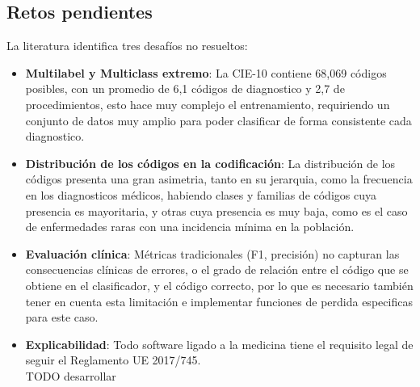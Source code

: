 \subsection{Retos pendientes}
La literatura identifica tres desafíos no resueltos:
\begin{itemize}
\item \textbf{Multilabel y Multiclass extremo}: La CIE-10 contiene 68,069 códigos posibles, con un promedio de 6,1 códigos de diagnostico y 2,7 de procedimientos, esto hace muy complejo el entrenamiento, requiriendo un conjunto de datos muy amplio para poder clasificar de forma consistente cada diagnostico.
\item \textbf{Distribución de los códigos en la codificación}: La distribución de los códigos presenta una gran asimetria, tanto en su jerarquia, como la frecuencia en los diagnosticos médicos, habiendo clases y familias de códigos cuya presencia es mayoritaria, y otras cuya presencia es muy baja, como es el caso de enfermedades raras con una incidencia mínima en la población.
\item \textbf{Evaluación clínica}: Métricas tradicionales (F1, precisión) no capturan las consecuencias clínicas de errores, o el grado de relación entre el código que se obtiene en el clasificador, y el código correcto, por lo que es necesario también tener en cuenta esta limitación e implementar funciones de perdida especificas para este caso. 
\item \textbf{Explicabilidad}: Todo software ligado a la medicina tiene el requisito legal de seguir el Reglamento UE 2017/745. \\TODO desarrollar\
\end{itemize}










